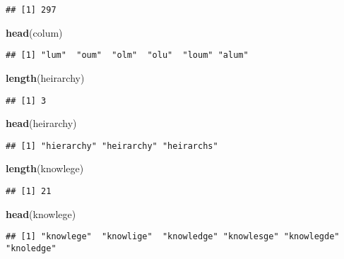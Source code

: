 \documentclass[]{article}
\newenvironment{Shaded}{\begin{snugshade}}{\end{snugshade}}
\newcommand{\KeywordTok}[1]{\textcolor[rgb]{0.13,0.29,0.53}{\textbf{#1}}}
\newcommand{\NormalTok}[1]{#1}
\begin{document}
\begin{verbatim}
## [1] 297
\end{verbatim}

\begin{Shaded}
\begin{Highlighting}[]
\KeywordTok{head}\NormalTok{(colum)}
\end{Highlighting}
\end{Shaded}

\begin{verbatim}
## [1] "lum"  "oum"  "olm"  "olu"  "loum" "alum"
\end{verbatim}

\begin{Shaded}
\begin{Highlighting}[]
\KeywordTok{length}\NormalTok{(heirarchy)}
\end{Highlighting}
\end{Shaded}

\begin{verbatim}
## [1] 3
\end{verbatim}

\begin{Shaded}
\begin{Highlighting}[]
\KeywordTok{head}\NormalTok{(heirarchy)}
\end{Highlighting}
\end{Shaded}

\begin{verbatim}
## [1] "hierarchy" "heirarchy" "heirarchs"
\end{verbatim}

\begin{Shaded}
\begin{Highlighting}[]
\KeywordTok{length}\NormalTok{(knowlege)}
\end{Highlighting}
\end{Shaded}

\begin{verbatim}
## [1] 21
\end{verbatim}

\begin{Shaded}
\begin{Highlighting}[]
\KeywordTok{head}\NormalTok{(knowlege)}
\end{Highlighting}
\end{Shaded}

\begin{verbatim}
## [1] "knowlege"  "knowlige"  "knowledge" "knowlesge" "knowlegde" "knoledge"
\end{verbatim}
\end{document}
